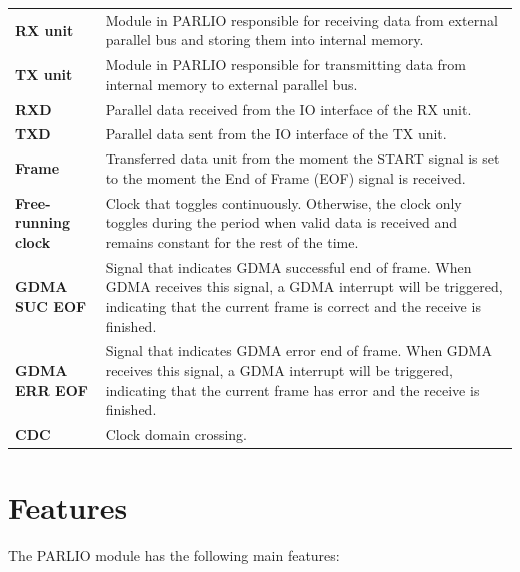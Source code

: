 \documentclass[main\_\_EN.tex]{subfiles}
\begin{document}
\begin{longtable}[c]{ R{4cm} p{10cm} }
\textbf{RX unit}            & Module in PARLIO responsible for receiving data from external parallel bus and storing them into internal memory. \\
\textbf{TX unit}            & Module in PARLIO responsible for transmitting data from internal memory to external parallel bus. \\
\textbf{RXD}                & Parallel data received from the IO interface of the RX unit. \\
\textbf{TXD}                & Parallel data sent from the IO interface of the TX unit. \\
\textbf{Frame}              & Transferred data unit from the moment the START signal is set to the moment the End of Frame (EOF) signal is received. \\
\textbf{Free-running clock} & Clock that toggles continuously. Otherwise, the clock only toggles during the period when valid data is received and remains constant for the rest of the time.\\
\textbf{GDMA SUC EOF}       & Signal that indicates GDMA successful end of frame. When GDMA receives this signal, a GDMA interrupt will be triggered, indicating that the current frame is correct and the receive is finished.\\
\textbf{GDMA ERR EOF}       & Signal that indicates GDMA error end of frame. When GDMA receives this signal, a GDMA interrupt will be triggered, indicating that the current frame has error and the receive is finished.\\
\textbf{CDC}                & Clock domain crossing.\\

\end{longtable}




\section{Features}
\label{sec:parlio-features}

The PARLIO module has the following main features:
\end{document}

